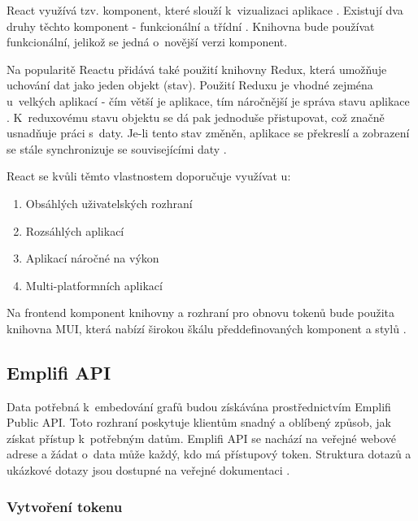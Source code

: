 \documentclass[czech, bc, kiv, he, iso690numb]{fasthesis}
\begin{document}
React využívá tzv. komponent, které slouží k~vizualizaci aplikace \cite{introToReact}. Existují dva druhy těchto komponent - funkcionální a třídní \cite{functionalVsClass}. Knihovna bude používat funkcionální, jelikož
se jedná o~novější verzi komponent.

Na popularitě Reactu přidává také použití knihovny Redux, která umožňuje uchování dat jako jeden objekt (stav). Použití Reduxu je vhodné zejména u~velkých aplikací - čím větší je aplikace, tím
náročnější je správa stavu aplikace \cite{introToRedux}. K~reduxovému stavu objektu se dá pak jednoduše přistupovat, což značně usnadňuje práci s~daty.
Je-li tento stav změněn, aplikace se překreslí a zobrazení se stále synchronizuje se souvisejícími daty \cite{whyUsingReact2}. 

React se kvůli těmto vlastnostem doporučuje využívat u:
\begin{enumerate}
\item Obsáhlých uživatelských rozhraní
\item Rozsáhlých aplikací
\item Aplikací náročné na výkon
\item Multi-platformních aplikací
\end{enumerate}

Na frontend komponent knihovny a rozhraní pro obnovu tokenů bude použita knihovna MUI, která nabízí širokou škálu předdefinovaných komponent a stylů \cite{muiDocs}. 	

\subsection{Emplifi API}	
Data potřebná k~embedování grafů budou získávána prostřednictvím Emplifi Public API. 
Toto rozhraní poskytuje klientům snadný a oblíbený způsob, jak získat přístup k~potřebným datům. 
Emplifi API se nachází na veřejné webové adrese a žádat o~data může každý, kdo má přístupový token.
Struktura dotazů a ukázkové dotazy jsou dostupné na veřejné dokumentaci \cite{emplifiDocs}.

\subsubsection{Vytvoření tokenu}
\end{document}
